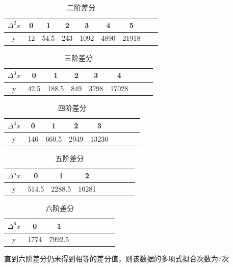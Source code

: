 \documentclass{article}
\begin{document}
\begin{table}[!h]
\begin{center}
\begin{tabular}{c|c c c c c c c c}
    $\Delta^2 x$ & 0 & 1 & 2 & 3 & 4 & 5  \\
    \hline
    y & 12 & 54.5 & 243 & 1092 & 4890 & 21918 \\
\end{tabular}
\caption{\label{demo-table}二阶差分}
\end{center}
\end{table}

\begin{table}[!h]
\begin{center}
\begin{tabular}{c|c c c c c c c c}
    $\Delta^3 x$ & 0 & 1 & 2 & 3 & 4  \\
    \hline
    y & 42.5 & 188.5 & 849 & 3798 & 17028  \\
\end{tabular}
\caption{\label{demo-table}三阶差分}
\end{center}
\end{table}

\begin{table}[!h]
\begin{center}
\begin{tabular}{c|c c c c c c c c}
    $\Delta^4 x$ & 0 & 1 & 2 & 3  \\
    \hline
    y & 146 & 660.5 & 2949 & 13230  \\
\end{tabular}
\caption{\label{demo-table}四阶差分}
\end{center}
\end{table}

\begin{table}[!h]
\begin{center}
\begin{tabular}{c|c c c c c c c c}
    $\Delta^5 x$ & 0 & 1 & 2  \\
    \hline
    y & 514.5 & 2288.5 & 10281  \\
\end{tabular}
\caption{\label{demo-table}五阶差分}
\end{center}
\end{table}

\newpage

\begin{table}[!h]
\begin{center}
\begin{tabular}{c|c c c c c c c c}
    $\Delta^6 x$ & 0 & 1  \\
    \hline
    y & 1774 & 7992.5  \\
\end{tabular}
\caption{\label{demo-table}六阶差分}
\end{center}
\end{table}

直到六阶差分仍未得到相等的差分值，则该数据的多项式拟合次数为7次
\end{document}
